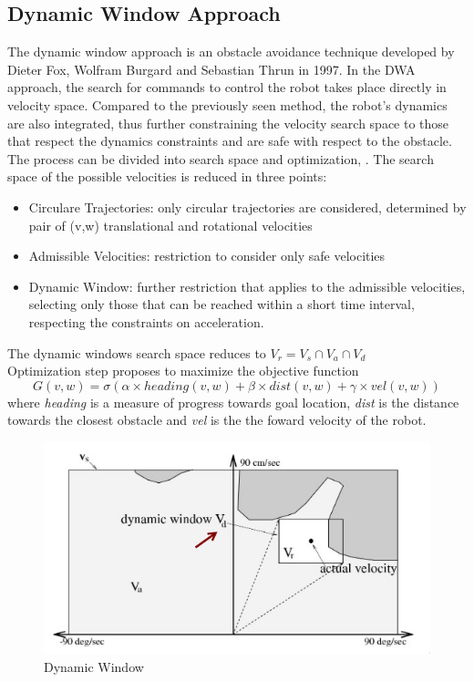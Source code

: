 \subsection{Dynamic Window Approach}
The dynamic window approach is an obstacle avoidance technique developed by Dieter Fox, Wolfram Burgard and Sebastian Thrun in 1997. 
In the DWA approach, the search for commands to control the robot takes place directly in velocity space. Compared to the previously seen method, the robot's dynamics are also integrated, thus further constraining the velocity search space to those that respect the dynamics constraints and are safe with respect to the obstacle.
The process can be divided into search space and optimization, \citet{fox1997}.
The search space of the possible velocities is reduced in three points:
    \begin{itemize}
        \item Circulare Trajectories: only circular trajectories are considered, determined by pair of (v,w) translational and rotational velocities
        \item Admissible Velocities: restriction to consider only safe velocities
        \item Dynamic Window: further restriction that applies to the admissible velocities, selecting only those that can be reached within a short time interval, respecting the constraints on acceleration.
    \end{itemize}
The dynamic windows search space reduces to $V_r = V_s \cap V_a \cap V_d$\\

Optimization step proposes to maximize the objective function
\begin{equation}
    G(v,w) = \sigma(\alpha \times heading(v,w) + \beta \times dist(v,w) + \gamma \times vel(v,w))
\end{equation}
where \textit{heading} is a measure of progress towards goal location, \textit{dist} is the distance towards the closest obstacle and \textit{vel} is the the foward velocity of the robot.
\begin{figure}[H]
    \centering
    \includegraphics[scale=0.75]{Images/Chapter 4/dynamic_window.jpg}
    \caption{Dynamic Window}
    \label{fig:dwa}
\end{figure}

